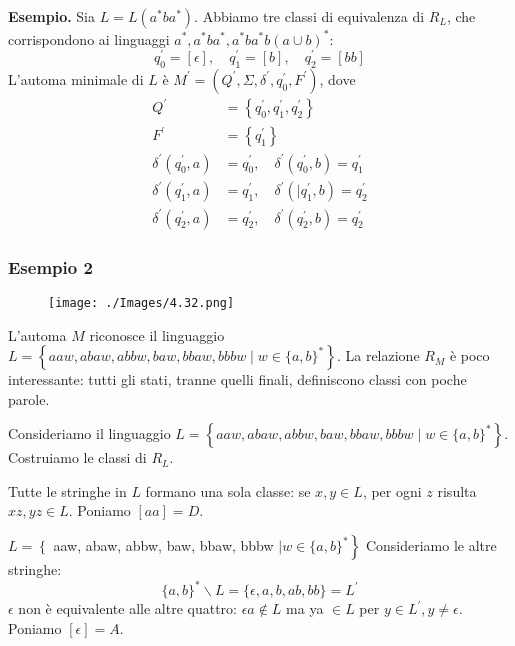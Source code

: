 \textbf{Esempio.} Sia $L=L\left(a^{*} b a^{*}\right)$.
Abbiamo tre classi di equivalenza di $R_{L}$, che corrispondono ai linguaggi $a^{*}, a^{*} b a^{*}, a^{*} b a^{*} b(a \cup b)^{*}:$
$$
q_{0}^{\prime}=[\epsilon], \quad q_{1}^{\prime}=[b], \quad q_{2}^{\prime}=[b b]
$$
L'automa minimale di $L$ è $M^{\prime}=\left(Q^{\prime}, \Sigma, \delta^{\prime}, q_{0}^{\prime}, F^{\prime}\right)$, dove
$$
\begin{aligned}
Q^{\prime} &=\left\{q_{0}^{\prime}, q_{1}^{\prime}, q_{2}^{\prime}\right\} \\
F^{\prime} &=\left\{q_{1}^{\prime}\right\} \\
\delta^{\prime}\left(q_{0}^{\prime}, a\right) &=q_{0}^{\prime}, \quad \delta^{\prime}\left(q_{0}^{\prime}, b\right)=q_{1}^{\prime} \\
\delta^{\prime}\left(q_{1}^{\prime}, a\right) &=q_{1}^{\prime}, \quad \delta^{\prime}\left(\mid q_{1}^{\prime}, b\right)=q_{2}^{\prime} \\
\delta^{\prime}\left(q_{2}^{\prime}, a\right) &=q_{2}^{\prime}, \quad \delta^{\prime}\left(q_{2}^{\prime}, b\right)=q_{2}^{\prime}
\end{aligned}
$$
\clearpage


\subsubsection{Esempio 2}

\begin{figure}[hbpt!]
    \centering
    \texttt{[image: ./Images/4.32.png]}
\end{figure}
\FloatBarrier

L'automa $M$ riconosce il linguaggio
$L=\left\{a a w, a b a w, a b b w, b a w, b b a w, b b b w \mid w \in\{a, b\}^{*}\right\} .$
La relazione $R_{M}$ è poco interessante: tutti gli stati, tranne quelli finali, definiscono classi con poche parole.

Consideriamo il linguaggio
$L=\left\{a a w, a b a w, a b b w, b a w, b b a w, b b b w \mid w \in\{a, b\}^{*}\right\} .$
Costruiamo le classi di $R_{L}$.

Tutte le stringhe in $L$ formano una sola classe: se $x, y \in L$, per ogni $z$ risulta $x z, y z \in L$. Poniamo $[a a]=D$.

\vspace{5mm}

$L=\left\{\right.$ aaw, abaw, abbw, baw, bbaw, bbbw $\left.\mid w \in\{a, b\}^{*}\right\}$ Consideriamo le altre stringhe:
$$
\{a, b\}^{*} \backslash L=\{\epsilon, a, b, a b, b b\}=L^{\prime}
$$
$\epsilon$ non è equivalente alle altre quattro: $\epsilon a \notin L$ ma ya $\in L$ per $y \in L^{\prime}, y \neq \epsilon$. Poniamo $[\epsilon]=A$.

